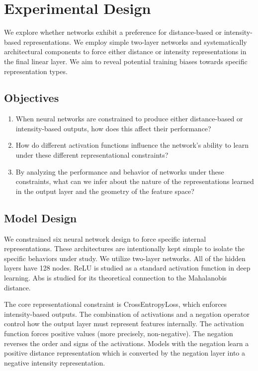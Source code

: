 \section{Experimental Design}
\label{sec:exp_design}

We explore whether networks exhibit a preference for distance-based or intensity-based representations. We employ simple two-layer networks and systematically architectural components to force either distance or intensity representations in the final linear layer. We aim to reveal potential training biases towards specific representation types.

\subsection{Objectives}
\begin{enumerate}
    \item When neural networks are constrained to produce either distance-based or intensity-based outputs, how does this affect their performance?
    
    \item How do different activation functions influence the network's ability to learn under these different representational constraints?
    \item By analyzing the performance and behavior of networks under these constraints, what can we infer about the nature of the representations learned in the output layer and the geometry of the feature space?
\end{enumerate}


\subsection{Model Design}

We constrained six neural network design to force specific internal representations. These architectures are intentionally kept simple to isolate the specific behaviors under study. We utilize two-layer networks. All of the hidden layers have 128 nodes. ReLU is studied as a standard activation function in deep learning. Abs is studied for its theoretical connection to the Mahalanobis distance.

The core representational constraint is CrossEntropyLoss, which enforces intensity-based outputs. The combination of activations and a negation operator control how the output layer must represent features internally. The activation function forces positive values (more precisely, non-negative). The negation reverses the order and signs of the activations. Models with the negation learn a positive distance representation which is converted by the negation layer into a negative intensity representation. 

